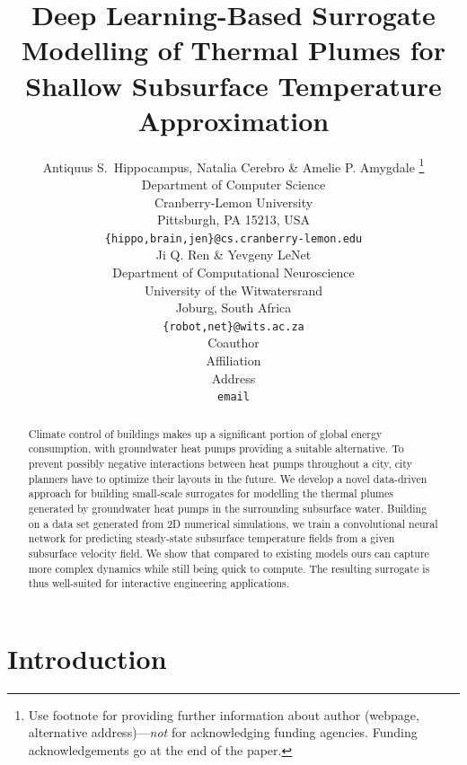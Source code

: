 \documentclass{article} %
\title{Deep Learning-Based Surrogate Modelling of Thermal Plumes for Shallow Subsurface Temperature Approximation}
\author{Antiquus S.~Hippocampus, Natalia Cerebro \& Amelie P. Amygdale \thanks{ Use footnote for providing further information
about author (webpage, alternative address)---\emph{not} for acknowledging
funding agencies.  Funding acknowledgements go at the end of the paper.} \\
Department of Computer Science\\
Cranberry-Lemon University\\
Pittsburgh, PA 15213, USA \\
\texttt{\{hippo,brain,jen\}@cs.cranberry-lemon.edu} \\
\And
Ji Q. Ren \& Yevgeny LeNet \\
Department of Computational Neuroscience \\
University of the Witwatersrand \\
Joburg, South Africa \\
\texttt{\{robot,net\}@wits.ac.za} \\
\AND
Coauthor \\
Affiliation \\
Address \\
\texttt{email}
}
\begin{document}
\maketitle

\begin{abstract}
   Climate control of buildings makes up a significant portion of global energy consumption, with groundwater heat pumps providing a suitable alternative.
   To prevent possibly negative interactions between heat pumps throughout a city, city planners have to optimize their layouts in the future.
   We develop a novel data-driven approach for building small-scale surrogates for modelling the thermal plumes generated by groundwater heat pumps in the surrounding subsurface water.
   Building on a data set generated from 2D numerical simulations, we train a convolutional neural network for predicting steady-state subsurface temperature fields from a given subsurface velocity field.
   We show that compared to existing models ours can capture more complex dynamics while still being quick to compute. %
   The resulting surrogate is thus well-suited for interactive engineering applications.
\end{abstract}

\section{Introduction}
\label{sec:intro}
\end{document}
